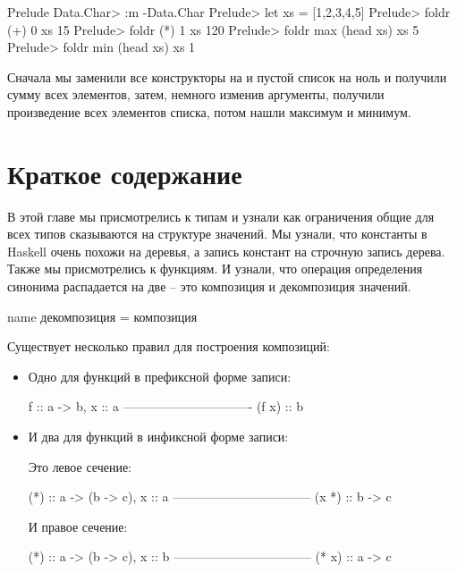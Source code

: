 \begin{code}
Prelude Data.Char> :m -Data.Char
Prelude> let xs = [1,2,3,4,5]
Prelude> foldr (+) 0 xs
15
Prelude> foldr (*) 1 xs
120
Prelude> foldr max (head xs) xs
5
Prelude> foldr min (head xs) xs
1
\end{code}

Сначала мы заменили все конструкторы \In{:} 
на \In{+} и пустой список на ноль и получили сумму всех элементов,
затем, немного изменив аргументы, получили произведение
всех элементов списка, потом нашли максимум и минимум. 

\section{Краткое содержание}

В этой главе мы присмотрелись к типам и узнали
как ограничения общие для всех типов сказываются на 
структуре значений. Мы узнали, что константы в Haskell 
очень похожи на деревья, а запись 
констант на строчную запись дерева. Также мы присмотрелись
к функциям. И узнали, что операция определения синонима 
распадается на две -- это композиция и декомпозиция значений.

\begin{code}
name   декомпозиция   =   композиция
\end{code}


Существует несколько правил для построения композиций:

\begin{itemize}

\item Одно для функций в префиксной форме записи:

\begin{code}
                    f :: a -> b,           x :: a 
                    -------------------------------
                              (f x) :: b
\end{code}

\item И два для функций в инфиксной форме записи:

Это левое сечение:

\begin{code}
                    (*) :: a -> (b -> c),     x :: a 
                    ---------------------------------
                             (x *) :: b -> c
\end{code}

И правое сечение:

\begin{code}
                    (*) :: a -> (b -> c),     x :: b 
                    ---------------------------------
                                (* x) :: a -> c
\end{code}

\end{itemize}


